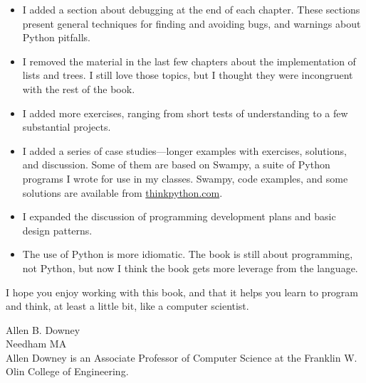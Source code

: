 \documentclass[10pt]{book}
\begin{document}
\begin{itemize}

\item I added a section about debugging at the end of each chapter.
  These sections present general techniques for finding and avoiding
  bugs, and warnings about Python pitfalls.

\item I removed the material in the last few chapters about the
  implementation of lists and trees.  I still love those topics, but I
  thought they were incongruent with the rest of the book.

\item I added more exercises, ranging from short tests of
  understanding to a few substantial projects.

\item I added a series of case studies---longer examples with
  exercises, solutions, and discussion.  Some of them are based on
  Swampy, a suite of Python programs I wrote for use in my classes.
  Swampy, code examples, and some solutions are available from
  \url{thinkpython.com}.
  
\item I expanded the discussion of programming development plans
  and basic design patterns.

\item The use of Python is more idiomatic.  The book is still about
  programming, not Python, but now I think the book gets more leverage
  from the language.

\end{itemize}

I hope you enjoy working with this book, and that it helps
you learn to program and think, at least a little bit, like
a computer scientist.


Allen B. Downey \\
Needham MA\\

Allen Downey is an Associate Professor of Computer Science at 
the Franklin W. Olin College of Engineering.






\end{document}
